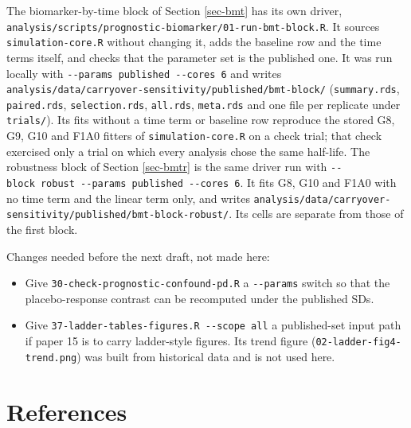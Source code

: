 \documentclass[
  11pt,
]{article}
\providecommand{\tightlist}{%
  \setlength{\itemsep}{0pt}\setlength{\parskip}{0pt}}
\begin{document}
The biomarker-by-time block of Section \ref{sec-bmt} has its own
driver, \texttt{analysis/scripts/prognostic-biomarker/01-run-bmt-block.R}.
It sources \texttt{simulation-core.R} without changing it, adds the baseline
row and the time terms itself, and checks that the parameter set is
the published one. It was run locally with
\texttt{-\/-params\ published\ -\/-cores\ 6} and writes
\texttt{analysis/data/carryover-sensitivity/published/bmt-block/}
(\texttt{summary.rds}, \texttt{paired.rds}, \texttt{selection.rds}, \texttt{all.rds}, \texttt{meta.rds}
and one file per replicate under \texttt{trials/}). Its fits without a time
term or baseline row reproduce the stored G8, G9, G10 and F1A0 fitters
of \texttt{simulation-core.R} on a check trial; that check exercised only a
trial on which every analysis chose the same half-life. The
robustness block of Section \ref{sec-bmtr} is the same driver run
with \texttt{-\/-block\ robust\ -\/-params\ published\ -\/-cores\ 6}. It fits G8, G10
and F1A0 with no time term and the linear term only, and writes
\texttt{analysis/data/carryover-sensitivity/published/bmt-block-robust/}.
Its cells are separate from those of the first block.

Changes needed before the next draft, not made here:

\begin{itemize}
\tightlist
\item
  Give \texttt{30-check-prognostic-confound-pd.R} a \texttt{-\/-params} switch so that
  the placebo-response contrast can be recomputed under the published
  SDs.
\item
  Give \texttt{37-ladder-tables-figures.R\ -\/-scope\ all} a published-set input
  path if paper 15 is to carry ladder-style figures. Its trend figure
  (\texttt{02-ladder-fig4-trend.png}) was built from historical data and is
  not used here.
\end{itemize}

\section*{References}\label{references}
\end{document}
